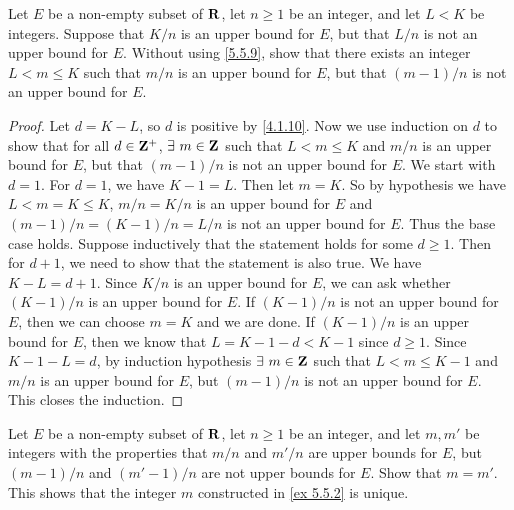 \begin{exercise}\label{ex 5.5.2}
  Let \(E\) be a non-empty subset of \(\mathbf{R}\), let \(n \geq 1\) be an integer, and let \(L < K\) be integers.
  Suppose that \(K / n\) is an upper bound for \(E\), but that \(L / n\) is not an upper bound for \(E\).
  Without using \cref{5.5.9}, show that there exists an integer \(L < m \leq K\) such that \(m / n\) is an upper bound for \(E\), but that \((m - 1) / n\) is not an upper bound for \(E\).
\end{exercise}

\begin{proof}
  Let \(d = K - L\), so \(d\) is positive by \cref{4.1.10}.
  Now we use induction on \(d\) to show that for all \(d \in \mathbf{Z}^+\), \(\exists\ m \in \mathbf{Z}\) such that \(L < m \leq K\) and \(m / n\) is an upper bound for \(E\), but that \((m - 1) / n\) is not an upper bound for \(E\).
  We start with \(d = 1\).
  For \(d = 1\), we have \(K - 1 = L\).
  Then let \(m = K\).
  So by hypothesis we have \(L < m = K \leq K\), \(m / n = K / n\) is an upper bound for \(E\) and \((m - 1) / n = (K - 1) / n = L / n\) is not an upper bound for \(E\).
  Thus the base case holds.
  Suppose inductively that the statement holds for some \(d \geq 1\).
  Then for \(d + 1\), we need to show that the statement is also true.
  We have \(K - L = d + 1\).
  Since \(K / n\) is an upper bound for \(E\), we can ask whether \((K - 1) / n\) is an upper bound for \(E\).
  If \((K - 1) / n\) is not an upper bound for \(E\), then we can choose \(m = K\) and we are done.
  If \((K - 1) / n\) is an upper bound for \(E\), then we know that \(L = K - 1 - d < K - 1\) since \(d \geq 1\).
  Since \(K - 1 - L = d\), by induction hypothesis \(\exists\ m \in \mathbf{Z}\) such that \(L < m \leq K - 1\) and \(m / n\) is an upper bound for \(E\), but \((m - 1) / n\) is not an upper bound for \(E\).
  This closes the induction.
\end{proof}

\begin{exercise}\label{ex 5.5.3}
  Let \(E\) be a non-empty subset of \(\mathbf{R}\), let \(n \geq 1\) be an integer, and let \(m, m'\) be integers with the properties that \(m / n\) and \(m' / n\) are upper bounds for \(E\), but \((m - 1) / n\) and \((m' - 1) / n\) are not upper bounds for \(E\).
  Show that \(m = m'\).
  This shows that the integer \(m\) constructed in \cref{ex 5.5.2} is unique.
\end{exercise}

